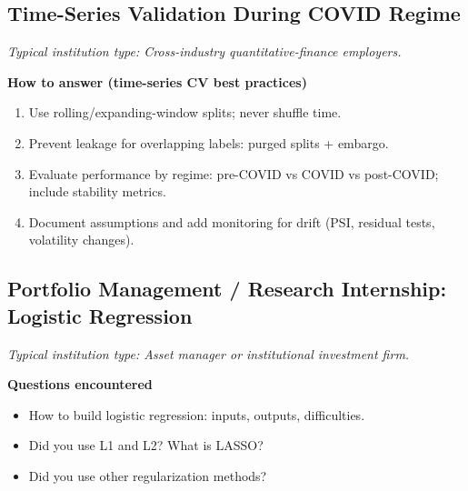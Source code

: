 \documentclass[11pt,letterpaper,openany]{book}
\newcommand{\RoleProfile}[2]{%
  \subsection{#1}%
  \noindent\textit{Typical institution type: #2.}\par
}
\begin{document}
\RoleProfile{Time-Series Validation During COVID Regime}{Cross-industry quantitative-finance employers}
\textbf{How to answer (time-series CV best practices)}
\begin{enumerate}
  \item Use rolling/expanding-window splits; never shuffle time.
  \item Prevent leakage for overlapping labels: purged splits + embargo.
  \item Evaluate performance by regime: pre-COVID vs COVID vs post-COVID; include stability metrics.
  \item Document assumptions and add monitoring for drift (PSI, residual tests, volatility changes).
\end{enumerate}

\RoleProfile{Portfolio Management / Research Internship: Logistic Regression}{Asset manager or institutional investment firm}
\textbf{Questions encountered}
\begin{itemize}
  \item How to build logistic regression: inputs, outputs, difficulties.
  \item Did you use L1 and L2? What is LASSO?
  \item Did you use other regularization methods?
\end{itemize}
\end{document}
